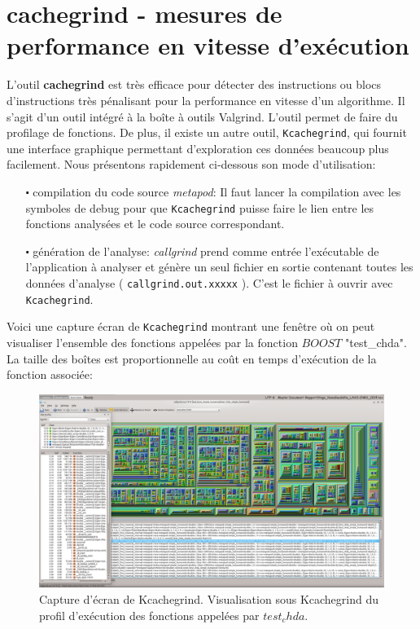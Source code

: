 
\chapter{cachegrind - mesures de performance en vitesse d'exécution} \label{appx_cachegrind}

L'outil \textbf{cachegrind} est très efficace pour détecter des instructions ou blocs d'instructions très pénalisant pour la performance en vitesse d'un algorithme. Il s'agit d'un outil intégré à la boîte à outils Valgrind. L'outil permet de faire du profilage de fonctions. De plus, il existe un autre outil, \verb;Kcachegrind;, qui fournit une interface graphique permettant d'exploration ces données beaucoup plus facilement. Nous présentons rapidement ci-dessous son mode d'utilisation:
\begin{itemize}
\item[$\centerdot$ compilation du code source \emph{metapod}:] Il faut lancer la compilation avec les symboles de debug pour que \verb;Kcachegrind; puisse faire le lien entre les fonctions analysées et le code source correspondant.
\item[$\centerdot$ génération de l'analyse:]  \emph{callgrind} prend comme entrée l'exécutable de l'application à analyser et génère un seul fichier en sortie contenant toutes les données d'analyse ( \verb;callgrind.out.xxxxx; ). C'est le fichier à ouvrir avec \verb;Kcachegrind;.
\end{itemize}

Voici une capture écran de \verb;Kcachegrind; montrant une fenêtre où on peut visualiser l'ensemble des fonctions appelées par la fonction $BOOST$ "test\_chda". La taille des boîtes est proportionnelle au coût en temps d'exécution de la fonction associée:

\begin{figure}[H]
  \begin{center}
  \includegraphics[width=\textwidth]{figs/snapshotKcachegrind1.png}
  \caption{Capture d'écran de Kcachegrind. Visualisation sous Kcachegrind du profil d'exécution des fonctions appelées par $test_chda$.}         %
  \label{fig:Kcachegrind1} %
  \end{center}
\end{figure}



